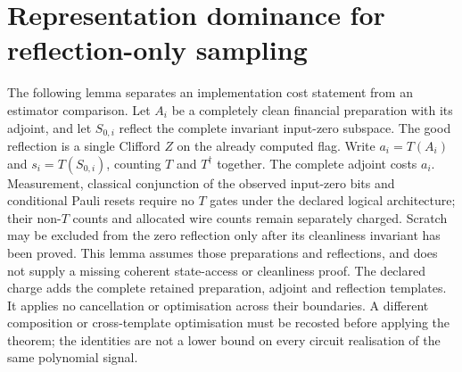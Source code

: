\documentclass[11pt]{article}
\begin{document}
\section{Representation dominance for reflection-only sampling}
\label{sec:representation-sampler-dominance}

The following lemma separates an implementation cost statement from an
estimator comparison. Let $A_i$ be a completely clean financial
preparation with its adjoint, and let $S_{0,i}$ reflect the complete
invariant input-zero subspace. The good reflection is a single Clifford
$Z$ on the already computed flag. Write $a_i=T(A_i)$ and
$s_i=T(S_{0,i})$, counting $T$ and $T^\dagger$ together. The complete
adjoint costs $a_i$. Measurement, classical conjunction of the observed
input-zero bits and conditional Pauli resets require no $T$ gates under
the declared logical architecture; their non-$T$ counts and allocated
wire counts remain separately charged. Scratch may be excluded from
the zero reflection only after its cleanliness invariant has been
proved. This lemma assumes those preparations and reflections, and
does not supply a missing coherent state-access or cleanliness proof.
The declared charge adds the complete retained preparation, adjoint and
reflection templates. It applies no cancellation or optimisation across
their boundaries. A different composition or cross-template optimisation
must be recosted before applying the theorem; the identities are not a
lower bound on every circuit realisation of the same polynomial signal.
\end{document}
